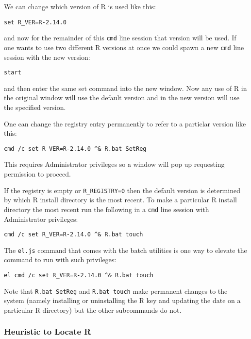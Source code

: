 We can change which version of R is used like this:

\begin{verbatim}
set R_VER=R-2.14.0
\end{verbatim}

and now for the remainder of this \texttt{cmd} line session that version
will be used. If one wants to use two different R versions at once we
could spawn a new \texttt{cmd} line session with the new version:

\begin{verbatim}
start
\end{verbatim}

and then enter the same set command into the new window. Now any use of
R in the original window will use the default version and in the new
version will use the specified version.

One can change the registry entry permanently to refer to a particlar
version like this:

\begin{verbatim}
cmd /c set R_VER=R-2.14.0 ^& R.bat SetReg
\end{verbatim}

This requires Administrator privileges so a window will pop up
requesting permission to proceed.

If the registry is empty or \texttt{R\_REGISTRY=0} then the default
version is determined by which R install directory is the most recent.
To make a particular R install directory the most recent run the
following in a \texttt{cmd} line session with Administrator privileges:

\begin{verbatim}
cmd /c set R_VER=R-2.14.0 ^& R.bat touch
\end{verbatim}

The \texttt{el.js} command that comes with the batch utilities is one
way to elevate the command to run with such privileges:

\begin{verbatim}
el cmd /c set R_VER=R-2.14.0 ^& R.bat touch
\end{verbatim}

Note that \texttt{R.bat SetReg} and \texttt{R.bat touch} make permanent
changes to the system (namely installing or uninstalling the R key and
updating the date on a particular R directory) but the other subcommands
do not.

\subsubsection{Heuristic to Locate R}

